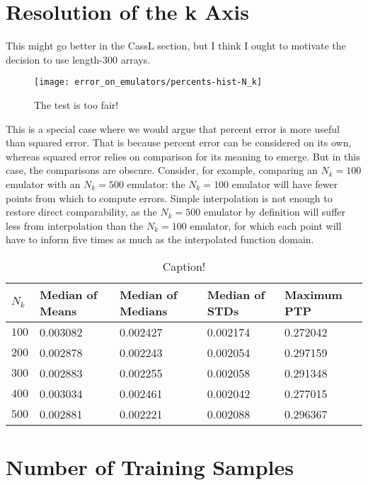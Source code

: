 \section{Resolution of the k Axis}

This might go better in the CassL section, but I think I ought to motivate the 
decision to use length-300 arrays.

\begin{figure}[ht!]
  \centering
  \texttt{[image: error\_on\_emulators/percents-hist-N\_k]}
  \caption[Impact of $N_k$ on Accuracy]{The test is too fair!}
  \label{fig: Nk_experiment}
\end{figure}

This is a special case where we would argue that percent error is more useful 
than squared error.
That is because percent error can be considered on its own, whereas squared
error relies on comparison for its meaning to emerge. But in this case, the
comparisons are obscure. Consider, for example, comparing an $N_k = 100$
emulator with an $N_k = 500$ emulator: the $N_k = 100$ emulator will have
fewer points from which to compute errors. Simple interpolation is not enough
to restore direct comparability, as the $N_k = 500$ emulator by definition
will suffer less from interpolation than the $N_k = 100$ emulator, for which
each point will have to inform five times as much as the interpolated function
domain.

\begin{table}[ht!]
\centering
\begin{tabular}{l|l|l|l|l}
\hline
$N_k$ & Median of Means & Median of Medians & Median of STDs & Maximum PTP \\ \hline
$100$ & 0.003082 & 0.002427 & 0.002174 & 0.272042 \\
$200$ & 0.002878 & 0.002243 & 0.002054 & 0.297159 \\
$300$ & 0.002883 & 0.002255 & 0.002058 & 0.291348 \\
$400$ & 0.003034 & 0.002461 & 0.002042 & 0.277015 \\
$500$ & 0.002881 & 0.002221 & 0.002088 & 0.296367 \\
\end{tabular}
	\cprotect\caption[$N_k$ Experiment: Percent Error Statistics]{Caption!}
 \label{tab: Nk_experiment_percerr_stats}
\end{table}

\section{Number of Training Samples}
\label{sec: num_samples}

